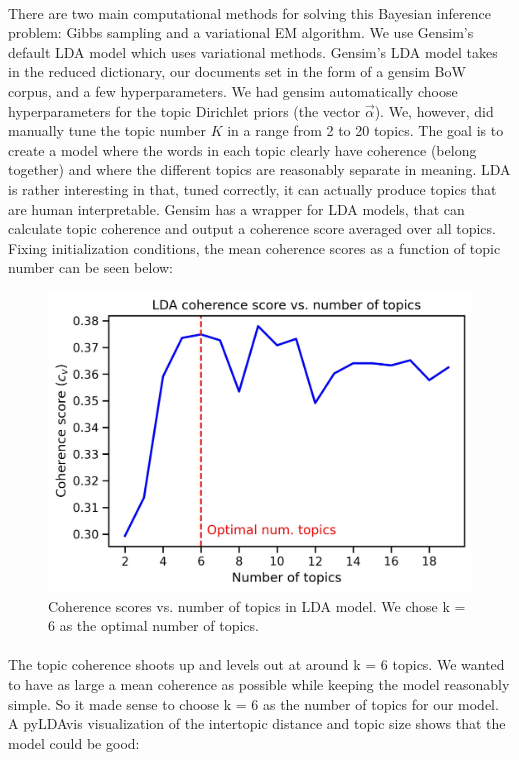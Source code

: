 \documentclass{article}
\begin{document}
\paragraph{} There are two main computational methods for solving this Bayesian inference problem: Gibbs sampling and a variational EM algorithm. We use Gensim's default LDA model which uses variational methods. Gensim's LDA model takes in the reduced dictionary, our documents set in the form of a gensim BoW corpus, and a few hyperparameters. We had gensim automatically choose hyperparameters for the topic Dirichlet priors (the vector $\vec{\alpha}$). We, however, did manually tune the topic number $K$ in a range from 2 to 20 topics. The goal is to create a model where the words in each topic clearly have coherence (belong together) and where the different topics are reasonably separate in meaning. LDA is rather interesting in that, tuned correctly, it can actually produce topics that are human interpretable. Gensim has a wrapper for LDA models, that can calculate topic coherence and output a coherence score averaged over all topics. Fixing initialization conditions, the mean coherence scores as a function of topic number can be seen below:

		 	 \begin{figure}[H]
	\begin{center}
		\includegraphics[totalheight=6cm]{../images/Modeling/LDA_coherence}
	\end{center}
	\caption{Coherence scores vs. number of topics in LDA model. We chose k = 6 as the optimal number of topics. }
\end{figure}

\paragraph{} The topic coherence shoots up and levels out at around k = 6 topics. We wanted to have as large a mean coherence as possible while keeping the model reasonably simple. So it made sense to choose k = 6 as the number of topics for our model.  A pyLDAvis visualization of the intertopic distance and topic size shows that the model could be good:
\end{document}

